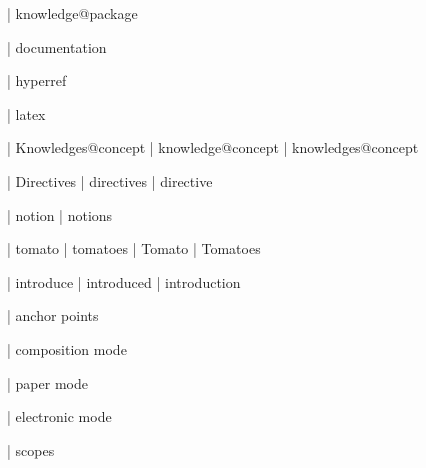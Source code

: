  | knowledge@package

 | documentation

 | hyperref

 | latex

 | Knowledges@concept
 | knowledge@concept
 | knowledges@concept

 | Directives
 | directives
 | directive

 | notion
 | notions

 | tomato
 | tomatoes
 | Tomato
 | Tomatoes

 | introduce
 | introduced
 | introduction

 | anchor points

 | composition mode

 | paper mode

 | electronic mode

 | scopes
